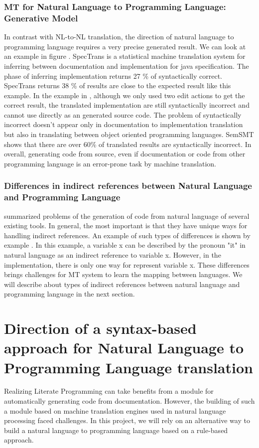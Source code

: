 \subsubsection{MT for Natural Language to Programming Language: Generative Model}
In contrast with NL-to-NL translation, the direction of natural language to programming language requires a very precise generated result. We can look at an example in figure \cite{}. SpecTrans \cite{} is a statistical machine translation system for inferring between documentation and implementation for java specification. The phase of inferring implementation returns 27 \% of syntactically correct. SpecTrans returns 38 \% of results are close to the expected result like this example. In the example in \cite{}, although we only used two edit actions to get the correct result, the translated implementation are still syntactically incorrect and cannot use directly as an generated source code. The problem of syntactically incorrect doesn't appear only in documentation to implementation translation but also in translating between object oriented programming languages. SemSMT \cite{} shows that there are over 60\% of translated results are syntactically incorrect. In overall, generating code from source, even if documentation or code from other programming language is an error-prone task by machine translation.
\subsubsection{Differences in indirect references between Natural Language and Programming Language}
\cite{} summarized problems of the generation of code from natural language of several existing tools. In general, the most important is that they have unique ways for handling indirect references. An example of such types of differences is shown by example \cite{}. In this example, a variable x can be described by the pronoun "it" in natural language as an indirect reference to variable x. However, in the implementation, there is only one way for represent variable x. These differences brings challenges for MT system to learn the mapping between languages. We will describe about types of indirect references between natural language and programming language in the next section.


\section{Direction of  a syntax-based approach for Natural Language to Programming Language translation}
Realizing Literate Programming can take benefits from a module for automatically generating code from documentation. However, the building of such a module based on machine translation engines used in natural language processing faced challenges. In this project, we will rely on an alternative way to build a natural language to programming language based on a rule-based approach. 










